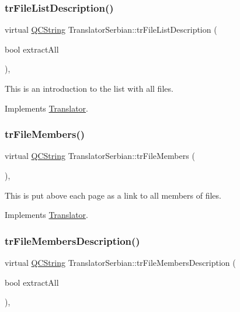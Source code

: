 \subsubsection{\texorpdfstring{trFileListDescription()}{trFileListDescription()}}
{\footnotesize\ttfamily virtual \mbox{\hyperlink{class_q_c_string}{Q\+C\+String}} Translator\+Serbian\+::tr\+File\+List\+Description (\begin{DoxyParamCaption}\item[{bool}]{extract\+All }\end{DoxyParamCaption})\hspace{0.3cm}{\ttfamily [inline]}, {\ttfamily [virtual]}}

This is an introduction to the list with all files. 

Implements \mbox{\hyperlink{class_translator}{Translator}}.

\mbox{\label{class_translator_serbian_a99880258bd837a4774f79383102b89e1}} 
\subsubsection{\texorpdfstring{trFileMembers()}{trFileMembers()}}
{\footnotesize\ttfamily virtual \mbox{\hyperlink{class_q_c_string}{Q\+C\+String}} Translator\+Serbian\+::tr\+File\+Members (\begin{DoxyParamCaption}{ }\end{DoxyParamCaption})\hspace{0.3cm}{\ttfamily [inline]}, {\ttfamily [virtual]}}

This is put above each page as a link to all members of files. 

Implements \mbox{\hyperlink{class_translator}{Translator}}.

\mbox{\label{class_translator_serbian_ae670152d11e5ac7d081cd85cdc055ce1}} 
\subsubsection{\texorpdfstring{trFileMembersDescription()}{trFileMembersDescription()}}
{\footnotesize\ttfamily virtual \mbox{\hyperlink{class_q_c_string}{Q\+C\+String}} Translator\+Serbian\+::tr\+File\+Members\+Description (\begin{DoxyParamCaption}\item[{bool}]{extract\+All }\end{DoxyParamCaption})\hspace{0.3cm}{\ttfamily [inline]}, {\ttfamily [virtual]}}

